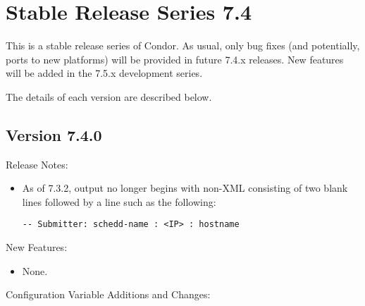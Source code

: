 
\section{\label{sec:History-7-4}Stable Release Series 7.4}

This is a stable release series of Condor.
As usual, only bug fixes (and potentially, ports to new platforms)
will be provided in future 7.4.x releases.
New features will be added in the 7.5.x development series.

The details of each version are described below.

\subsection*{\label{sec:New-7-4-0}Version 7.4.0}

\noindent Release Notes:

\begin{itemize}

\item As of 7.3.2,   output no longer begins with
non-XML consisting of two blank lines followed by a line such as the
following:

\begin{verbatim}
-- Submitter: schedd-name : <IP> : hostname
\end{verbatim}

\end{itemize}


\noindent New Features:

\begin{itemize}

\item None.

\end{itemize}

\noindent Configuration Variable Additions and Changes:

